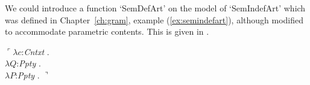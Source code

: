 We could introduce a function `SemDefArt' on the model of `SemIndefArt'
which was defined in Chapter~\ref{ch:gram}, example
(\ref{ex:semindefart}), although modified to accommodate parametric contents.  %
This is given in \nexteg{}.
\begin{ex}
  $\ulcorner\lambda c$:\textit{Cntxt} . \\
\hspace*{1em}$\lambda Q$:\textit{Ppty} . \\
\hspace*{2em} $\lambda P$:\textit{Ppty}
. $\urcorner$ 
\end{ex} 



